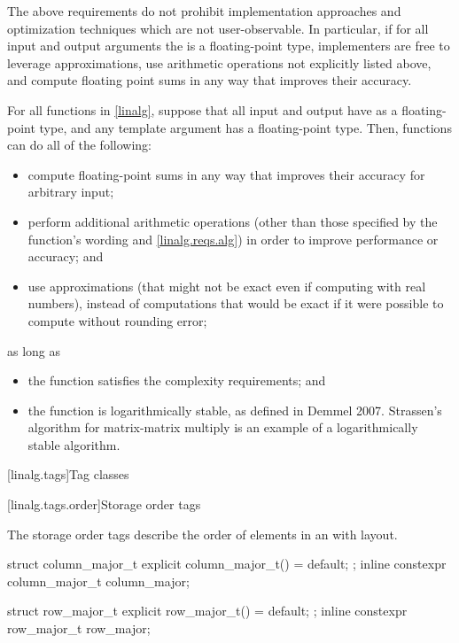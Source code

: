 \begin{note}
The above requirements do not prohibit
implementation approaches and optimization techniques
which are not user-observable.
In particular, if for all input and output arguments
the  is a floating-point type,
implementers are free to leverage approximations,
use arithmetic operations not explicitly listed above, and
compute floating point sums in any way that improves their accuracy.
\end{note}

\pnum
\begin{note}
For all functions in \ref{linalg},
suppose that all input and output  have as 
a floating-point type, and
any  template argument has a floating-point type.
Then, functions can do all of the following:
\begin{itemize}
\item
compute floating-point sums in any way
that improves their accuracy for arbitrary input;
\item
perform additional arithmetic operations
(other than those specified by the function's wording and \ref{linalg.reqs.alg})
in order to improve performance or accuracy; and
\item
use approximations
(that might not be exact even if computing with real numbers),
instead of computations that would be exact
if it were possible to compute without rounding error;
\end{itemize}
as long as
\begin{itemize}
\item
the function satisfies the complexity requirements; and
\item
the function is logarithmically stable,
as defined in Demmel 2007\supercite{linalg-stable}.
Strassen's algorithm for matrix-matrix multiply
is an example of a logarithmically stable algorithm.
\end{itemize}
\end{note}

[linalg.tags]{Tag classes}

[linalg.tags.order]{Storage order tags}

\pnum
The storage order tags describe
the order of elements in an  with
 layout.
\begin{itemdecl}
struct column_major_t {
  explicit column_major_t() = default;
};
inline constexpr column_major_t column_major{};

struct row_major_t {
  explicit row_major_t() = default;
};
inline constexpr row_major_t row_major{};
\end{itemdecl}

